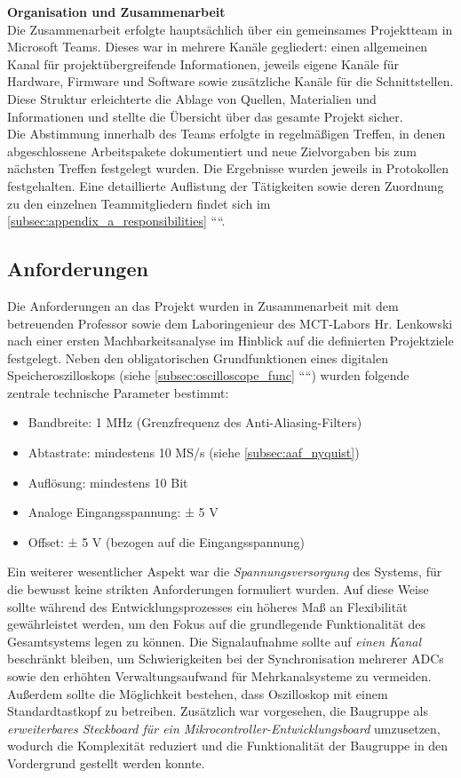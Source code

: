 \documentclass[a4paper, portrait, 12pt]{scrartcl} %
\begin{document}
\textbf{Organisation und Zusammenarbeit}\\
Die Zusammenarbeit erfolgte hauptsächlich über ein gemeinsames Projektteam in Microsoft Teams. Dieses war in mehrere Kanäle gegliedert: einen allgemeinen Kanal für projektübergreifende Informationen, jeweils eigene Kanäle für Hardware, Firmware und Software sowie zusätzliche Kanäle für die Schnittstellen. Diese Struktur erleichterte die Ablage von Quellen, Materialien und Informationen und stellte die Übersicht über das gesamte Projekt sicher.\\
Die Abstimmung innerhalb des Teams erfolgte in regelmäßigen Treffen, in denen abgeschlossene Arbeitspakete dokumentiert und neue Zielvorgaben bis zum nächsten Treffen festgelegt wurden. Die Ergebnisse wurden jeweils in Protokollen festgehalten. Eine detaillierte Auflistung der Tätigkeiten sowie deren Zuordnung zu den einzelnen Teammitgliedern findet sich im \autoref{subsec:appendix_a_responsibilities} ````.
\pagebreak

\subsection{Anforderungen}
\label{subsec:requirements}
Die Anforderungen an das Projekt wurden in Zusammenarbeit mit dem betreuenden Professor sowie dem Laboringenieur des MCT-Labors Hr. Lenkowski nach einer ersten Machbarkeitsanalyse im Hinblick auf die definierten Projektziele festgelegt. Neben den obligatorischen Grundfunktionen eines digitalen Speicheroszilloskops (siehe \autoref{subsec:oscilloscope_func} ````) wurden folgende zentrale technische Parameter bestimmt:
\begin{itemize}
\item Bandbreite: 1 MHz (Grenzfrequenz des Anti-Aliasing-Filters)
\item Abtastrate: mindestens 10 MS/s (siehe \autoref{subsec:aaf_nyquist})
\item Auflösung: mindestens 10 Bit
\item Analoge Eingangsspannung: ± 5 V
\item Offset: ± 5 V (bezogen auf die Eingangsspannung)
\end{itemize}

Ein weiterer wesentlicher Aspekt war die \emph{Spannungsversorgung} des Systems, für die bewusst keine strikten Anforderungen formuliert wurden. Auf diese Weise sollte während des Entwicklungsprozesses ein höheres Maß an Flexibilität gewährleistet werden, um den Fokus auf die grundlegende Funktionalität des Gesamtsystems legen zu können. Die Signalaufnahme sollte auf \emph{einen Kanal} beschränkt bleiben, um Schwierigkeiten bei der Synchronisation mehrerer ADCs sowie den erhöhten Verwaltungsaufwand für Mehrkanalsysteme zu vermeiden. Außerdem sollte die Möglichkeit bestehen, dass Oszilloskop mit einem Standardtastkopf zu betreiben. Zusätzlich war vorgesehen, die Baugruppe als \emph{erweiterbares Steckboard für ein Mikrocontroller-Entwicklungsboard} umzusetzen, wodurch die Komplexität reduziert und die Funktionalität der Baugruppe in den Vordergrund gestellt werden konnte.\\
\end{document}
